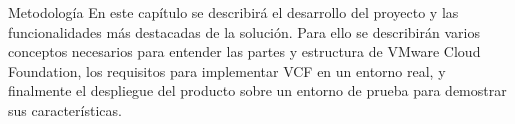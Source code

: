 \begin{chapter}{Metodología}
\label{chap:Metodologia}
En este capítulo se describirá el desarrollo del proyecto y las funcionalidades más destacadas de la solución. Para ello se describirán varios conceptos necesarios para entender las partes y estructura de VMware Cloud Foundation, los requisitos para implementar VCF en un entorno real, y finalmente el despliegue del producto sobre un entorno de prueba para demostrar sus características.

%



%
%

\end{chapter}